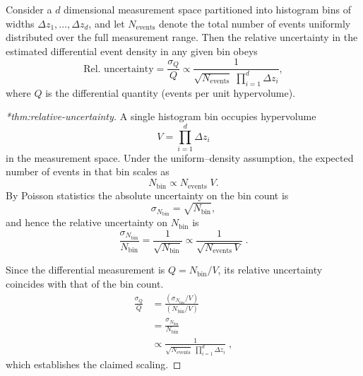             \begin{theorem}
                \label{thm:relative-uncertainty}
                Consider a \(d\) dimensional measurement space partitioned into histogram bins of widths \(\Delta z_1,\dots,\Delta z_d\), and let \(N_{\text{events}}\) denote the total number of events uniformly distributed over the full measurement range.
                Then the relative uncertainty in the estimated differential event density in any given bin obeys
                \begin{equation}
                    \text{Rel.\ uncertainty} = \frac{\sigma_{Q}}{Q} \propto \frac{1}{\sqrt{N_{\text{events}}}\;\prod_{i=1}^d\Delta z_i},
                \end{equation}
                where \(Q\) is the differential quantity (events per unit hypervolume).
            \end{theorem}
            \begin{proof}[*thm:relative-uncertainty]
            
                A single histogram bin occupies hypervolume
                \[
                    V = \prod_{i=1}^d \Delta z_i
                \]
                in the measurement space.
                Under the uniform--density assumption, the expected number of events in that bin scales as
                \[
                    N_{\text{bin}} \propto N_{\text{events}}\;V.
                \]
                By Poisson statistics the absolute uncertainty on the bin count is
                \[
                    \sigma_{N_{\text{bin}}} = \sqrt{N_{\text{bin}}},
                \]
                and hence the relative uncertainty on \(N_{\text{bin}}\) is
                \[
                    \frac{\sigma_{N_{\text{bin}}}}{N_{\text{bin}}} = \frac{1}{\sqrt{N_{\text{bin}}}} \propto \frac{1}{\sqrt{N_{\text{events}}\,V}}\;.
                \]
                
                Since the differential measurement is \(Q = N_{\text{bin}}/V\), its relative uncertainty coincides with that of the bin count.
                \begin{align}
                    \frac{\sigma_Q}{Q} &= \frac{(\sigma_{N_{\text{bin}}}/V)}{(N_{\text{bin}}/V)} \\
                    &= \frac{\sigma_{N_{\text{bin}}}}{N_{\text{bin}}} \\
                    &\propto \frac{1}{\sqrt{N_{\text{events}}}\;\prod_{i=1}^d\Delta z_i}\;,
                \end{align}
                which establishes the claimed scaling.
            \end{proof}
            
